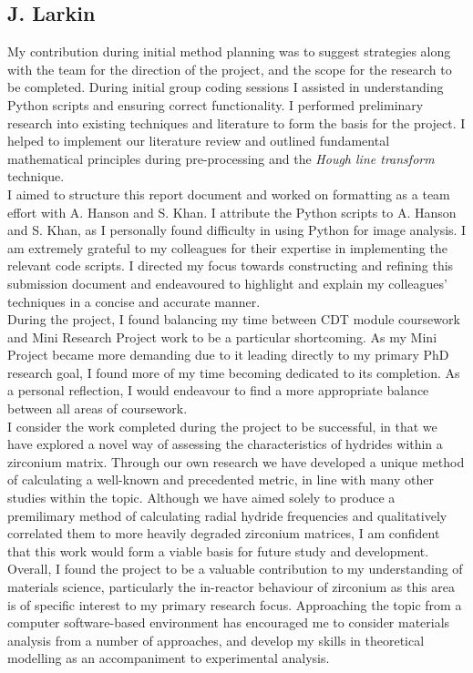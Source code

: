 \documentclass{article}
\begin{document}
\subsection{J. Larkin}
My contribution during initial method planning was to suggest strategies along with the team for the direction of the project, and the scope for the research to be completed. During initial group coding sessions I assisted in understanding Python scripts and ensuring correct functionality. I performed preliminary research into existing techniques and literature to form the basis for the project. I helped to implement our literature review and outlined fundamental mathematical principles during pre-processing and the \textit{Hough line transform} technique.
\\
I aimed to structure this report document and worked on formatting as a team effort with A. Hanson and S. Khan. I attribute the Python scripts to A. Hanson and S. Khan, as I personally found difficulty in using Python for image analysis. I am extremely grateful to my colleagues for their expertise in implementing the relevant code scripts. I directed my focus towards constructing and refining this submission document and endeavoured to highlight and explain my colleagues' techniques in a concise and accurate manner.
\\
During the project, I found balancing my time between CDT module coursework and Mini Research Project work to be a particular shortcoming. As my Mini Project became more demanding due to it leading directly to my primary PhD research goal, I found more of my time becoming dedicated to its completion. As a personal reflection, I would endeavour to find a more appropriate balance between all areas of coursework.
\\
I consider the work completed during the project to be successful, in that we have explored a novel way of assessing the characteristics of hydrides within a zirconium matrix. Through our own research we have developed a unique method of calculating a well-known and precedented metric, in line with many other studies within the topic. Although we have aimed solely to produce a premilimary method of calculating radial hydride frequencies and qualitatively correlated them to more heavily degraded zirconium matrices, I am confident that this work would form a viable basis for future study and development.
\\
Overall, I found the project to be a valuable contribution to my understanding of materials science, particularly the in-reactor behaviour of zirconium as this area is of specific interest to my primary research focus. Approaching the topic from a computer software-based environment has encouraged me to consider materials analysis from a number of approaches, and develop my skills in theoretical modelling as an accompaniment to experimental analysis.
\end{document}
